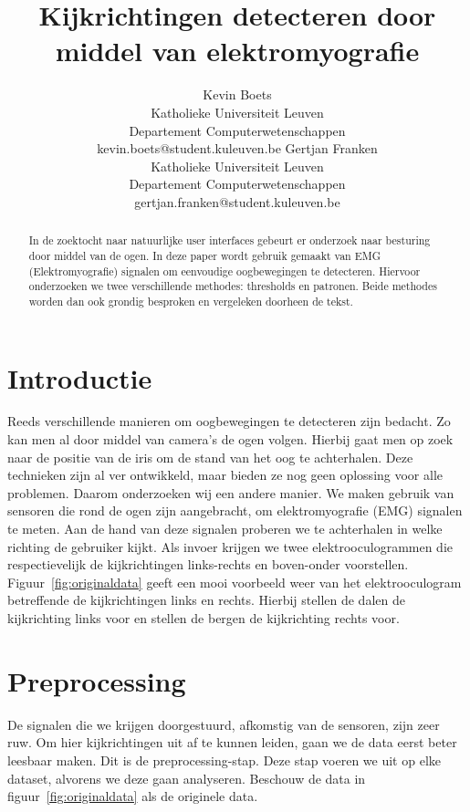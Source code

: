 \documentclass{article}
\title{Kijkrichtingen detecteren door middel van elektromyografie}
\author{Kevin Boets \\ Katholieke Universiteit Leuven\\ Departement Computerwetenschappen \\ kevin.boets@student.kuleuven.be
\And
Gertjan Franken \\ Katholieke Universiteit Leuven\\ Departement Computerwetenschappen \\ gertjan.franken@student.kuleuven.be}
\begin{document}
\maketitle

\begin{abstract}
In de zoektocht naar natuurlijke user interfaces gebeurt er onderzoek naar besturing door middel van de ogen. In deze paper wordt gebruik gemaakt van EMG (Elektromyografie) signalen om eenvoudige oogbewegingen te detecteren. Hiervoor onderzoeken we twee verschillende methodes: thresholds en patronen. Beide methodes worden dan ook grondig besproken en vergeleken doorheen de tekst.
\end{abstract}

\section{Introductie}

Reeds verschillende manieren om oogbewegingen te detecteren zijn bedacht. Zo kan men al door middel van camera's de ogen volgen. Hierbij gaat men op zoek naar de positie van de iris om de stand van het oog te achterhalen. Deze technieken zijn al ver ontwikkeld, maar bieden ze nog geen oplossing voor alle problemen. Daarom onderzoeken wij een andere manier. We maken gebruik van sensoren die rond de ogen zijn aangebracht, om elektromyografie (EMG) signalen te meten. Aan de hand van deze signalen proberen we te achterhalen in welke richting de gebruiker kijkt. Als invoer krijgen we twee elektrooculogrammen die respectievelijk de kijkrichtingen links-rechts en boven-onder voorstellen. Figuur~\ref{fig:originaldata} geeft een mooi voorbeeld weer van het elektrooculogram betreffende de kijkrichtingen links en rechts. Hierbij stellen de dalen de kijkrichting links voor en stellen de bergen de kijkrichting rechts voor.

\section{Preprocessing}

De signalen die we krijgen doorgestuurd, afkomstig van de sensoren, zijn zeer ruw. Om hier kijkrichtingen uit af te kunnen leiden, gaan we de data eerst beter leesbaar maken. Dit is de preprocessing-stap. Deze stap voeren we uit op elke dataset,  alvorens we deze gaan analyseren. Beschouw de data in figuur~\ref{fig:originaldata} als de originele data.
\end{document}

